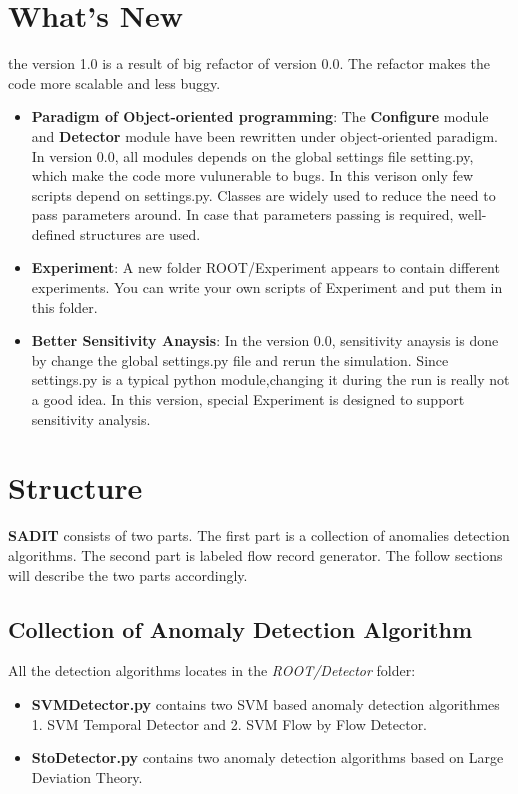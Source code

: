 \documentclass[letterpaper,10pt,english]{sphinxmanual}
\begin{document}
\chapter{What's New}
\label{index:what-s-new}
the version 1.0 is a result of big refactor of version 0.0. The refactor makes the code more
scalable and less buggy.
\begin{itemize}
\item {} 
\textbf{Paradigm of Object-oriented programming}: The \textbf{Configure} module and \textbf{Detector} module have been rewritten under
object-oriented paradigm. In version 0.0, all modules depends on the global
settings file setting.py, which make the code more vulunerable to bugs. In this verison only
few scripts depend on settings.py. Classes are widely used to reduce the need to
pass parameters around. In case that parameters passing is required, well-defined structures are used.

\item {} 
\textbf{Experiment}: A new folder ROOT/Experiment appears to contain different
experiments. You can write your own scripts of Experiment and put them in
this folder.

\item {} 
\textbf{Better Sensitivity Anaysis}: In the version 0.0, sensitivity anaysis is
done by change the global settings.py file and rerun the simulation. Since
settings.py is a typical python module,changing it during the run is really not
a good idea. In this version, special Experiment is designed to support
sensitivity analysis.

\end{itemize}


\chapter{Structure}
\label{index:structure}
\textbf{SADIT} consists of  two parts. The first part is a collection of anomalies
detection algorithms. The second part is labeled flow record generator. The
follow sections will describe the two parts accordingly.


\section{Collection of Anomaly Detection Algorithm}
\label{index:collection-of-anomaly-detection-algorithm}
All the detection algorithms locates in the \emph{ROOT/Detector} folder:
\begin{itemize}
\item {} 
\textbf{SVMDetector.py} contains two SVM based anomaly detection algorithmes
1. SVM Temporal Detector and 2. SVM Flow by Flow Detector.

\item {} 
\textbf{StoDetector.py} contains two anomaly detection algorithms based on
Large Deviation Theory.

\end{itemize}
\end{document}
